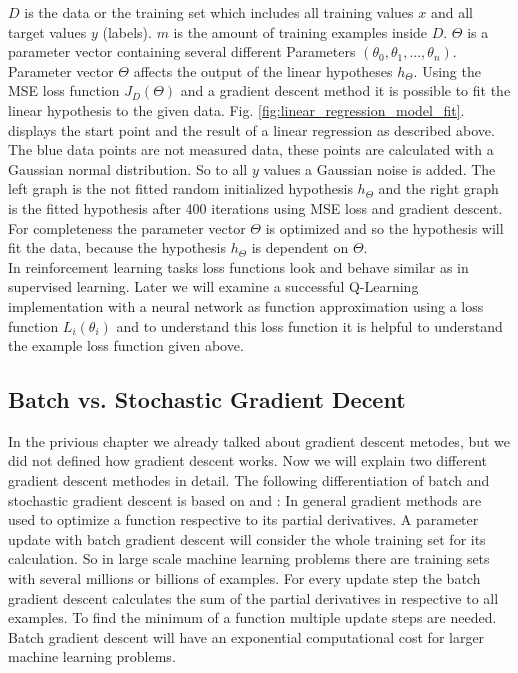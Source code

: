 \documentclass[conference]{IEEEtran}
\begin{document}
$D$ is the data or the training set which includes all training values $x$ and all target values $y$ (labels). $m$ is the amount of training examples inside $D$. $\Theta$ is a parameter vector containing several different Parameters $(\theta_0, \theta_1, ..., \theta_n)$. Parameter vector $\Theta$ affects the output of the linear hypotheses $h_\Theta$. Using the MSE loss function $J_D(\Theta)$ and a gradient descent method it is possible to fit the linear hypothesis to the given data. Fig. \ref{fig:linear_regression_model_fit}. displays the start point and the result of a linear regression as described above. The blue data points are not measured data, these points are calculated with a Gaussian normal distribution. So to all $y$ values a Gaussian noise is added. The left graph is the not fitted random initialized hypothesis $h_\Theta$ and the right graph is the fitted hypothesis after 400 iterations using MSE loss and gradient descent. For completeness the parameter vector $\Theta$ is optimized and so the hypothesis  will fit the data, because the hypothesis $h_\Theta$ is dependent on $\Theta$. \\

In reinforcement learning tasks loss functions look and behave similar as in supervised learning. Later we will examine a successful Q-Learning implementation with a neural network as function approximation using a loss function $L_i(\theta_i)$ and to understand this loss function it is helpful to understand the example loss function given above.

\subsection{Batch vs. Stochastic Gradient Decent}
In the privious chapter we already talked about gradient descent metodes, but we did not defined how gradient descent works. Now we will explain two different gradient descent methodes in detail. The following differentiation of batch and stochastic gradient descent is based on \cite{bottou-bousquet-2008} and \cite{bottou-2010}: In general gradient methods are used to optimize a function respective to its partial derivatives. A parameter update with batch gradient descent will consider the whole training set for its calculation. So in large scale machine learning problems there are training sets with several millions or billions of examples. For every update step the batch gradient descent calculates the sum of the partial derivatives in respective to all examples. To find the minimum of a function multiple update steps are needed. Batch gradient descent will have an exponential computational cost for larger machine learning problems. \\
\end{document}
